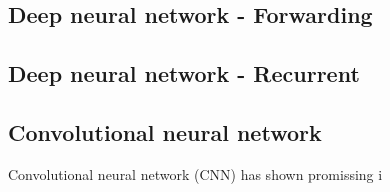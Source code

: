 \subsection{Deep neural network - Forwarding}
\subsection{Deep neural network - Recurrent}
\subsection{Convolutional neural network}
Convolutional neural network (CNN) has shown promissing i
